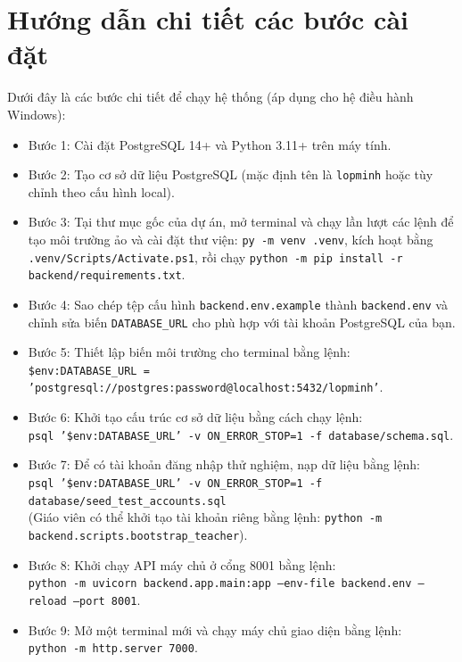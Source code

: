 \section{Hướng dẫn chi tiết các bước cài đặt}
Dưới đây là các bước chi tiết để chạy hệ thống (áp dụng cho hệ điều hành Windows):
\begin{itemize}
    \item Bước 1: Cài đặt PostgreSQL 14+ và Python 3.11+ trên máy tính.
    \item Bước 2: Tạo cơ sở dữ liệu PostgreSQL (mặc định tên là \texttt{lopminh} hoặc tùy chỉnh theo cấu hình local).
    \item Bước 3: Tại thư mục gốc của dự án, mở terminal và chạy lần lượt các lệnh để tạo môi trường ảo và cài đặt thư viện: \texttt{py -m venv .venv}, kích hoạt bằng \texttt{.venv/Scripts/Activate.ps1}, rồi chạy \texttt{python -m pip install -r backend/requirements.txt}.
    \item Bước 4: Sao chép tệp cấu hình \texttt{backend.env.example} thành \texttt{backend.env} và chỉnh sửa biến \texttt{DATABASE\_URL} cho phù hợp với tài khoản PostgreSQL của bạn.
    \item Bước 5: Thiết lập biến môi trường cho terminal bằng lệnh:\\
    \texttt{\$env:DATABASE\_URL = 'postgresql://postgres:password@localhost:5432/lopminh'}.
    \item Bước 6: Khởi tạo cấu trúc cơ sở dữ liệu bằng cách chạy lệnh:\\
    \texttt{psql '\$env:DATABASE\_URL' -v ON\_ERROR\_STOP=1 -f database/schema.sql}.
    \item Bước 7: Để có tài khoản đăng nhập thử nghiệm, nạp dữ liệu bằng lệnh:\\
    \texttt{psql '\$env:DATABASE\_URL' -v ON\_ERROR\_STOP=1 -f database/seed\_test\_accounts.sql}\\
    (Giáo viên có thể khởi tạo tài khoản riêng bằng lệnh: \texttt{python -m backend.scripts.bootstrap\_teacher}).
    \item Bước 8: Khởi chạy API máy chủ ở cổng 8001 bằng lệnh:\\
    \texttt{python -m uvicorn backend.app.main:app --env-file backend.env --reload --port 8001}.
    \item Bước 9: Mở một terminal mới và chạy máy chủ giao diện bằng lệnh:\\
    \texttt{python -m http.server 7000}.
\end{itemize}

